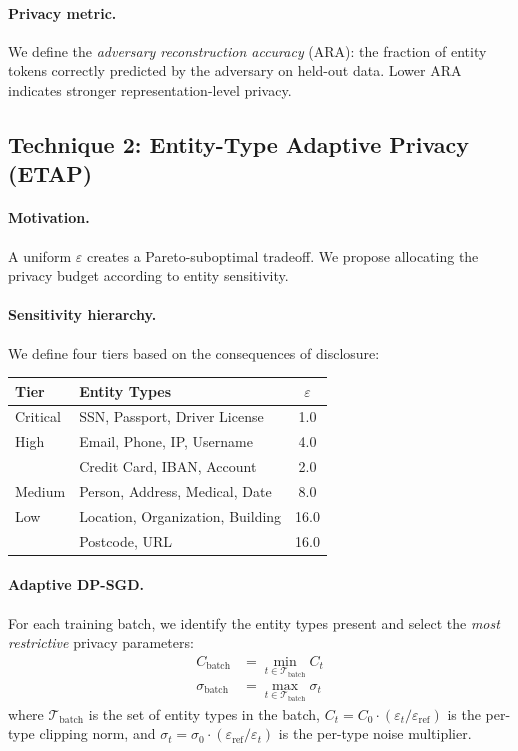 \documentclass[11pt,a4paper]{article}
\begin{document}
\paragraph{Privacy metric.}
We define the \emph{adversary reconstruction accuracy} (ARA): the fraction of
entity tokens correctly predicted by the adversary on held-out data.  Lower
ARA indicates stronger representation-level privacy.

\subsection{Technique 2: Entity-Type Adaptive Privacy (ETAP)}
\label{sec:etap}

\paragraph{Motivation.}
A uniform $\varepsilon$ creates a Pareto-suboptimal tradeoff.  We propose
allocating the privacy budget according to entity sensitivity.

\paragraph{Sensitivity hierarchy.}
We define four tiers based on the consequences of disclosure:
\begin{center}
\small
\begin{tabular}{llc}
\toprule
\textbf{Tier} & \textbf{Entity Types} & $\varepsilon$ \\
\midrule
Critical & SSN, Passport, Driver License & 1.0 \\
High & Email, Phone, IP, Username & 4.0 \\
         & Credit Card, IBAN, Account & 2.0 \\
Medium & Person, Address, Medical, Date & 8.0 \\
Low & Location, Organization, Building & 16.0 \\
    & Postcode, URL & 16.0 \\
\bottomrule
\end{tabular}
\end{center}

\paragraph{Adaptive DP-SGD.}
For each training batch, we identify the entity types present and select the
\emph{most restrictive} privacy parameters:
\begin{align}
    C_{\text{batch}} &= \min_{t \in \mathcal{T}_{\text{batch}}} C_t \\
    \sigma_{\text{batch}} &= \max_{t \in \mathcal{T}_{\text{batch}}} \sigma_t
\end{align}
where $\mathcal{T}_{\text{batch}}$ is the set of entity types in the batch,
$C_t = C_0 \cdot (\varepsilon_t / \varepsilon_{\text{ref}})$ is the per-type
clipping norm, and $\sigma_t = \sigma_0 \cdot (\varepsilon_{\text{ref}} /
\varepsilon_t)$ is the per-type noise multiplier.
\end{document}
